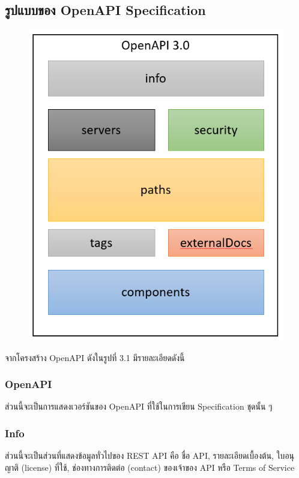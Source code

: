 \subsection{รูปแบบของ OpenAPI Specification}
        \begin{figure}[H]
            \centering
                \centering
                \includegraphics[width=5in]{latex/figures/openapi3.png}
        \end{figure}
จากโครงสร้าง OpenAPI ดังในรูปที่ 3.1 มีรายละเอียดดังนี้

\subsubsection{OpenAPI}
\raggedright ส่วนนี้จะเป็นการแสดงเวอร์ชันของ OpenAPI ที่ใช้ในการเขียน Specification ชุดนั้น ๆ
\subsubsection{Info}
\raggedright ส่วนนี้จะเป็นส่วนที่แสดงข้อมูลทั่วไปของ REST API คือ ชื่อ API, รายละเอียดเบื้องต้น, \mbox{ใบอนุญาติ} (license) ที่ใช้, ช่องทางการติดต่อ (contact) ของเจ้าของ API หรือ Terms of Service
